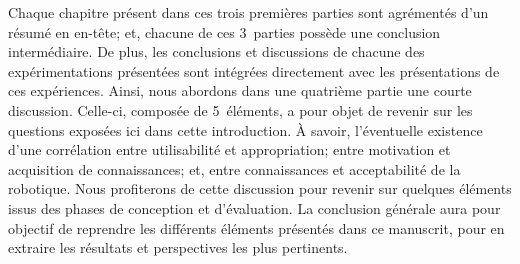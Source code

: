         Chaque chapitre présent dans ces trois premières parties sont agrémentés d'un résumé en en-tête; et, chacune de ces 3~parties possède une conclusion intermédiaire.
        De plus, les conclusions et discussions de chacune des expérimentations présentées sont intégrées directement avec les présentations de ces expériences.
        Ainsi, nous abordons dans une quatrième partie une courte discussion. Celle-ci, composée de 5~éléments, a pour objet de revenir sur les questions exposées ici dans cette introduction.
        À savoir, l'éventuelle existence d'une corrélation entre utilisabilité et appropriation; entre motivation et acquisition de connaissances; et, entre connaissances et acceptabilité de la robotique. Nous profiterons de cette discussion pour revenir sur quelques éléments issus des phases de conception et d'évaluation.
        La conclusion générale aura pour objectif de reprendre les différents éléments présentés dans ce manuscrit, pour en extraire les résultats et perspectives les plus pertinents.\par%
